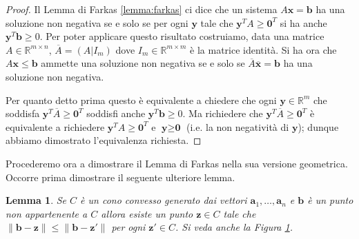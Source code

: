 \documentclass[italian, 12pt, reqno]{article}
\theoremstyle{myteo}
\newtheorem{lemma}[theorem]{Lemma}
\numberwithin{equation}{section}
\begin{document}
\begin{proof}
  Il Lemma di Farkas \ref{lemma:farkas} ci dice che un sistema \(A \textbf{x}= \textbf{b}\) ha una soluzione non negativa se e solo se per ogni \(\textbf{y}\) tale che \(\textbf{y}^TA \geq \textbf{0}^T\) si ha anche \(\textbf{y}^T \textbf{b} \geq 0\).
  Per poter applicare questo risultato costruiamo, data una matrice \(A\in \mathbb{R}^{m\times n}\), \(\overline{A}= (A|I_m)\) dove \(I_m\in \mathbb{R}^{m\times m}\) è la matrice identità.
  Si ha ora che \(A \textbf{x} \leq \textbf{b}\) ammette una soluzione non negativa se e solo se \(\overline{A} \mathbf{\overline{x}} = \textbf{b}\) ha una soluzione non negativa.

  Per quanto detto prima questo è equivalente a chiedere che ogni \(\textbf{y}\in \mathbb{R}^m\) che soddisfa \(\mathbf{y}^T\overline{A} \geq \textbf{0}^T\) soddisfi anche \(\mathbf{y}^T \textbf{b} \geq 0\).
  Ma richiedere che \(\textbf{y}^T\overline{A} \geq \textbf{0}^T\) è equivalente a richiedere \(\textbf{y}^TA \geq \textbf{0}^T\) e \(\textbf{y} \geq \textbf{0}\) (i.e. la non negatività di \(\textbf{y}\)); dunque abbiamo dimostrato l'equivalenza richiesta.
\end{proof}

Procederemo ora a dimostrare il Lemma di Farkas nella sua versione geometrica.
Occorre prima dimostrare il seguente ulteriore lemma.

\begin{lemma}
  \label{lemma:punto_vicino}
  Se \(C\) è un cono convesso generato dai vettori \(\mathbf{a}_1,\ldots,\mathbf{a}_n\) e \(\mathbf{b}\) è un punto non appartenente a \(C\) allora esiste un punto \(\mathbf{z}\in C\) tale che \(\|\mathbf{b} - \mathbf{z}\| \le \|\mathbf{b} - \mathbf{z}'\|\) per ogni \(\mathbf{z}'\in C\).
  Si veda anche la Figura \ref{fig:punto_vicino}.
\end{lemma}

\begin{figure}[h]
  \begin{center}
    \hspace{1cm}
  \end{center}
  \caption{}
  \label{fig:punto_vicino}
\end{figure}
\end{document}
